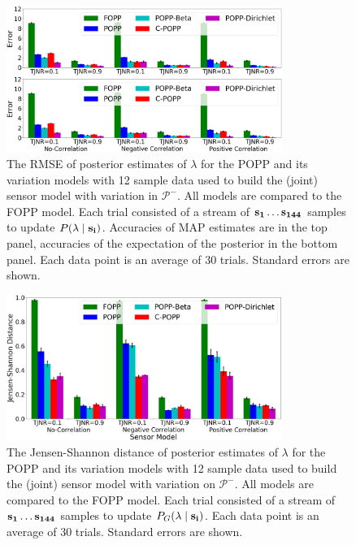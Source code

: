 \begin{figure}[t!]
	\centering
	\includegraphics[width=0.8\textwidth]{./figures/tjnr_comparison_120.png}
    \caption{The RMSE of posterior estimates of $\lambda$ for the POPP and its variation models with 12 sample data used to build the (joint) sensor model with variation in $\mathcal{P^-}$. All models are compared to the FOPP model. Each trial consisted of a stream of $\protect\mathbf{s_1} \ldots \protect\mathbf{s_{144}}$ samples to update $P(\lambda \mid \protect\mathbf{s_i})$. Accuracies of MAP estimates are  in the top panel, accuracies of the expectation of the posterior in the bottom panel. Each data point is an average of 30 trials. Standard errors are shown.} 
	\label{fig:tjnr_comparison_120}
	\vspace{-20pt}
\end{figure}

\begin{figure}[t!]
	\centering
	\includegraphics[width=0.8\textwidth]{./figures/tjnr_comparison_120_kl.png}
	\caption{The Jensen-Shannon distance of posterior estimates of $\lambda$ for the POPP and its variation models with 12 sample data used to build the (joint) sensor model with variation on $\mathcal{P^-}$. All models are compared to the FOPP model. Each trial consisted of a stream of $\protect\mathbf{s_1} \ldots \protect\mathbf{s_{144}}$ samples to update $P_G(\lambda \mid \protect\mathbf{s_i})$. Each data point is an average of 30 trials. Standard errors are shown.} 
	\label{fig:tjnr_comparison_120_kl}
	\vspace{-15pt}
\end{figure}


